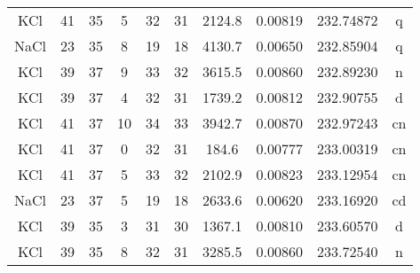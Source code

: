 \begin{table*}[htp]
\begin{tabular}{cccccccccc}
KCl & 41 & 35 & 5 & 32 & 31 & 2124.8 & 0.00819 & 232.74872 & q \\
NaCl & 23 & 35 & 8 & 19 & 18 & 4130.7 & 0.00650 & 232.85904 & q \\
KCl & 39 & 37 & 9 & 33 & 32 & 3615.5 & 0.00860 & 232.89230 & n \\
KCl & 39 & 37 & 4 & 32 & 31 & 1739.2 & 0.00812 & 232.90755 & d \\
KCl & 41 & 37 & 10 & 34 & 33 & 3942.7 & 0.00870 & 232.97243 & cn \\
KCl & 41 & 37 & 0 & 32 & 31 & 184.6 & 0.00777 & 233.00319 & cn \\
KCl & 41 & 37 & 5 & 33 & 32 & 2102.9 & 0.00823 & 233.12954 & cn \\
NaCl & 23 & 37 & 5 & 19 & 18 & 2633.6 & 0.00620 & 233.16920 & cd \\
KCl & 39 & 35 & 3 & 31 & 30 & 1367.1 & 0.00810 & 233.60570 & d \\
KCl & 39 & 35 & 8 & 32 & 31 & 3285.5 & 0.00860 & 233.72540 & n \\
\hline
\end{tabular}

\par 
\end{table*}
